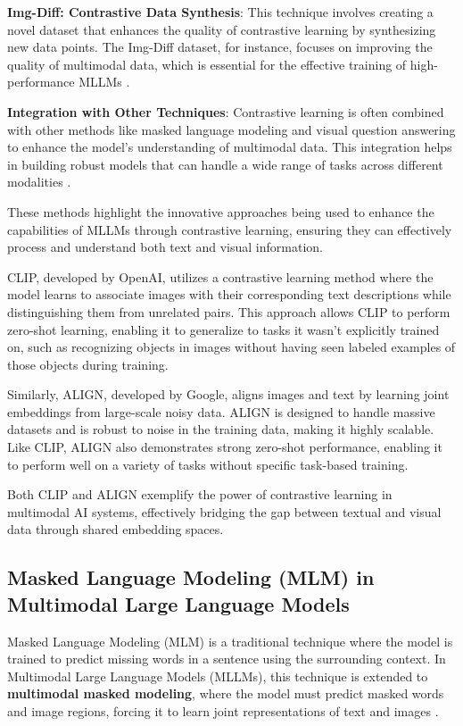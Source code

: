 \textbf{Img-Diff: Contrastive Data Synthesis}: This technique involves creating a novel dataset that enhances the quality of contrastive learning by synthesizing new data points. The Img-Diff dataset, for instance, focuses on improving the quality of multimodal data, which is essential for the effective training of high-performance MLLMs \cite{cite3}.

\textbf{Integration with Other Techniques}: Contrastive learning is often combined with other methods like masked language modeling and visual question answering to enhance the model's understanding of multimodal data. This integration helps in building robust models that can handle a wide range of tasks across different modalities \cite{cite4}.

These methods highlight the innovative approaches being used to enhance the capabilities of MLLMs through contrastive learning, ensuring they can effectively process and understand both text and visual information.

CLIP, developed by OpenAI, utilizes a contrastive learning method where the model learns to associate images with their corresponding text descriptions while distinguishing them from unrelated pairs. This approach allows CLIP to perform zero-shot learning, enabling it to generalize to tasks it wasn't explicitly trained on, such as recognizing objects in images without having seen labeled examples of those objects during training.

Similarly, ALIGN, developed by Google, aligns images and text by learning joint embeddings from large-scale noisy data. ALIGN is designed to handle massive datasets and is robust to noise in the training data, making it highly scalable. Like CLIP, ALIGN also demonstrates strong zero-shot performance, enabling it to perform well on a variety of tasks without specific task-based training.

Both CLIP and ALIGN exemplify the power of contrastive learning in multimodal AI systems, effectively bridging the gap between textual and visual data through shared embedding spaces.


\subsection{Masked Language Modeling (MLM) in Multimodal Large Language Models}

Masked Language Modeling (MLM) is a traditional technique where the model is trained to predict missing words in a sentence using the surrounding context. In Multimodal Large Language Models (MLLMs), this technique is extended to \textbf{multimodal masked modeling}, where the model must predict masked words and image regions, forcing it to learn joint representations of text and images \cite{ComprehensiveSurvey2024}.

